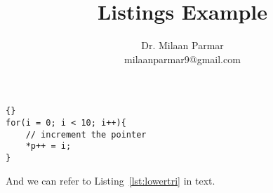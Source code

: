 \documentclass{article}
\begin{document}
\title{Listings Example}
\author{Dr. Milaan Parmar \\ milaanparmar9@gmail.com} 
\maketitle 

\lstset{language=c++}
\lstset{caption=Some C++ Code}
\begin{lstlisting}[frame=single]{}
for(i = 0; i < 10; i++){
    // increment the pointer
    *p++ = i;
}
\end{lstlisting}

\lstset{language=java,frame=single,basicstyle=\ttfamily,numbers=left}


And we can refer to Listing~\ref{lst:lowertri} in text.
\end{document}
